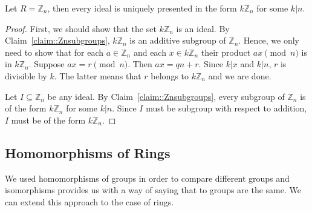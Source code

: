 \begin{claim}
\label{claim::ZnIdeals}
Let $R = \mathbb Z_n$, then every ideal is uniquely presented in the form $k\mathbb Z_n$ for some $k|n$.
\end{claim}
\begin{proof}

First, we should show that the set $k \mathbb Z_n$ is an ideal.
By Claim~\ref{claim::Znsubgroups}, $k \mathbb Z_n$ is an additive subgroup of $\mathbb Z_n$.
Hence, we only need to show that for each $a\in \mathbb Z_n$ and each $x\in k \mathbb Z_n$ their product $a x \pmod n$ is in $k \mathbb Z_n$.
Suppose $a x = r \pmod n$.
Then $a x = q n + r$.
Since $k|x$ and $k | n$, $r$ is divisible by $k$.
The latter means that $r$ belongs to $k \mathbb Z_n$ and we are done.

Let $I\subseteq \mathbb Z_n$ be any ideal.
By Claim~\ref{claim::Znsubgroups}, every subgroup of $\mathbb Z_n$ is of the form $k \mathbb Z_n$ for some $k | n$.
Since $I$ must be subgroup with respect to addition, $I$ must be of the form $k \mathbb Z_n$.
\end{proof}



\subsection{Homomorphisms of Rings}

We used homomorphisms of groups in order to compare different groups and isomorphisms provides us with a way of saying that to groups are the same.
We can extend this approach to the case of rings.

